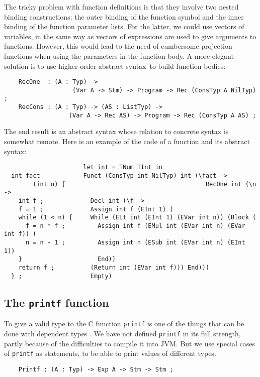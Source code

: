 \documentclass[12pt]{article}
\newcommand{\HOAS}{higher-order abstract syntax}
\begin{document}
The tricky problem with function definitions
is that they involve two nested binding constructions:
the outer binding of the function symbol and the inner
binding of the function parameter lists.
For the latter, we could use
vectors of variables, in the same way as vectors of
expressions are used to give arguments to functions.
However, this would lead to the need of cumbersome
projection functions when using the parameters
in the function body. A more elegant solution is
to use \HOAS\ to build function bodies:
\begin{verbatim}
    RecOne  : (A : Typ) -> 
                   (Var A -> Stm) -> Program -> Rec (ConsTyp A NilTyp) ;
    RecCons : (A : Typ) -> (AS : ListTyp) -> 
                  (Var A -> Rec AS) -> Program -> Rec (ConsTyp A AS) ;
\end{verbatim}
The end result is an abstract syntax whose relation
to concrete syntax is somewhat remote. Here is an example of
the code of a function and its abstract syntax:
\begin{verbatim}
                      let int = TNum TInt in
  int fact            Funct (ConsTyp int NilTyp) int (\fact -> 
        (int n) {                                       RecOne int (\n -> 
    int f ;             Decl int (\f -> 
    f = 1 ;             Assign int f (EInt 1) ( 
    while (1 < n) {     While (ELt int (EInt 1) (EVar int n)) (Block (
      f = n * f ;         Assign int f (EMul int (EVar int n) (EVar int f)) (
      n = n - 1 ;         Assign int n (ESub int (EVar int n) (EInt 1)) 
    }                     End)) 
    return f ;          (Return int (EVar int f))) End))) 
  } ;                   Empty)
\end{verbatim}


\subsection{The \texttt{printf} function}

To give a valid type to the C function \texttt{printf}
is one of the things that can be done with
dependent types \cite{cayenne}. We have not defined \texttt{printf}
in its full strength, partly because of the difficulties to compile
it into JVM. But we use special cases of \texttt{printf} as
statements, to be able to print values of different types.
\begin{verbatim}
    Printf : (A : Typ) -> Exp A -> Stm -> Stm ;
\end{verbatim}
\end{document}
